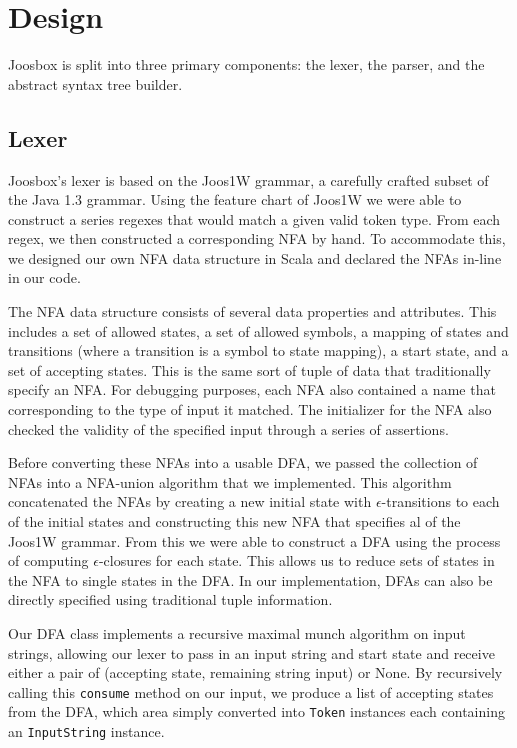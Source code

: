 \documentclass[letterpaper]{article}
\begin{document}
  \section{Design}

  Joosbox is split into three primary components: the lexer, the parser, and the
  abstract syntax tree builder.

  \subsection{Lexer}

  Joosbox's lexer is based on the Joos1W grammar, a carefully crafted subset of
  the Java 1.3 grammar. Using the feature chart of Joos1W we were able to
  construct a series regexes that would match a given valid token type. From
  each regex, we then constructed a corresponding NFA by hand. To accommodate
  this, we designed our own NFA data structure in Scala and declared the NFAs
  in-line in our code.

  The NFA data structure consists of several data properties and attributes.
  This includes a set of allowed states, a set of allowed symbols, a mapping
  of states and transitions (where a transition is a symbol to state mapping),
  a start state, and a set of accepting states. This is the same sort of tuple
  of data that traditionally specify an NFA. For debugging purposes, each NFA
  also contained a name that corresponding to the type of input it matched. The
  initializer for the NFA also checked the validity of the specified input
  through a series of assertions.

  Before converting these NFAs into a usable DFA, we passed the collection of
  NFAs into a NFA-union algorithm that we implemented. This algorithm
  concatenated the NFAs by creating a new initial state with
  $\epsilon$-transitions to each of the initial states and constructing this
  new NFA that specifies al of the Joos1W grammar. From this we were able to
  construct a DFA using the process of computing $\epsilon$-closures for each
  state. This allows us to reduce sets of states in the NFA to single states in
  the DFA. In our implementation, DFAs can also be directly specified using
  traditional tuple information.

  Our DFA class implements a recursive maximal munch algorithm on input
  strings, allowing our lexer to pass in an input string and start state and
  receive either a pair of (accepting state, remaining string input) or None.
  By recursively calling this {\tt consume} method on our input, we produce
  a list of accepting states from the DFA, which area simply converted into
  {\tt Token} instances each containing an {\tt InputString} instance.
\end{document}
